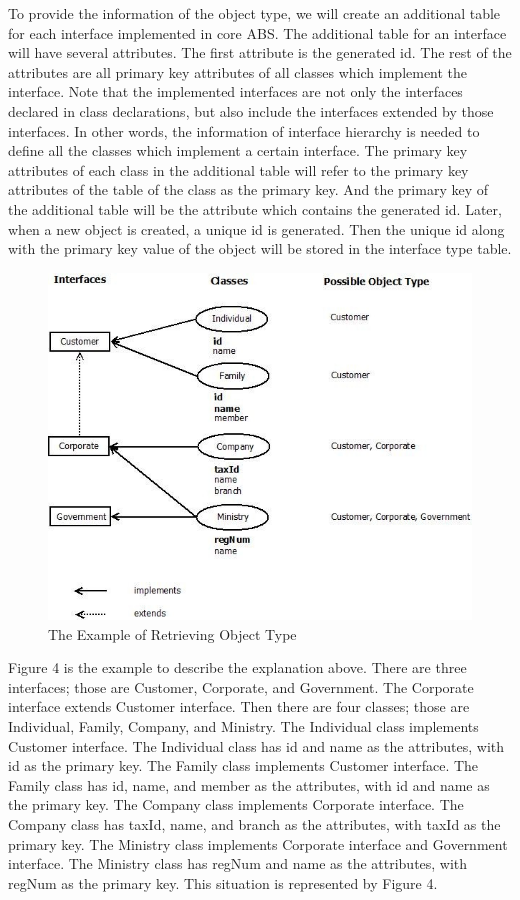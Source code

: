 \documentclass[runningheads,a4paper]{llncs}
\begin{document}
To provide the information of the object type, we will create an additional table for each interface implemented in core ABS. The additional table for an interface will have several attributes. The first attribute is the generated id. The rest of the attributes are all primary key attributes of all classes which implement the interface. Note that the implemented interfaces are not only the interfaces declared in class declarations, but also include the interfaces extended by those interfaces. In other words, the information of interface hierarchy is needed to define all the classes which implement a certain interface. The primary key attributes of each class in the additional table will refer to the primary key attributes of the table of the class as the primary key. And the primary key of the additional table will be the attribute which contains the generated id. Later, when a new object is created, a unique id is generated. Then the unique id along with the primary key value of the object will be stored in the interface type table.

\begin{figure}
	\centering
	\includegraphics[scale=0.6]{sample.jpg}
	\caption{The Example of Retrieving Object Type}
	\label{sample}
\end{figure}

Figure 4 is the example to describe the explanation above. There are three interfaces; those are Customer, Corporate, and Government. The Corporate interface extends Customer interface. Then there are four classes; those are Individual, Family, Company, and Ministry. The Individual class implements Customer interface. The Individual class has id and name as the attributes, with id as the primary key. The Family class implements Customer interface. The Family class has id, name, and member as the attributes, with id and name as the primary key. The Company class implements Corporate interface. The Company class has taxId, name, and branch as the attributes, with taxId as the primary key. The Ministry class implements Corporate interface and Government interface. The Ministry class has regNum and name as the attributes, with regNum as the primary key. This situation is represented by Figure 4. 
\end{document}
